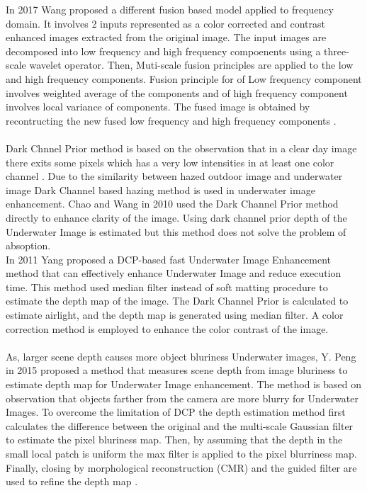\documentclass[a4paper,11pt,oneside]{article}
\begin{document}
  In 2017 Wang \cite{12} proposed a different fusion based model applied to frequency domain. It involves 2 inputs represented as a color corrected and contrast enhanced images extracted from the original image. The input images are decomposed into low frequency and high frequency compoenents using a three-scale wavelet operator. Then, Muti-scale fusion principles are applied to the low and high frequency components. Fusion principle for of Low frequency component involves weighted average of the components and of high frequency component involves local variance of components. The fused image is obtained by recontructing the new fused low frequency and high frequency components \cite{12}.\\
  \\
  Dark Chnnel Prior method is based on the observation that in a clear day image there exits some pixels which has a very low intensities in at least one color channel \cite{15}. Due to the similarity between hazed outdoor image and underwater image Dark Channel based hazing method is used in underwater image enhancement. Chao and Wang in 2010 \cite{25} used the Dark Channel Prior method directly to enhance clarity of the image. Using dark channel prior depth of the Underwater Image is estimated but this method does not solve the problem of absoption\cite{25}.\\
  In 2011 Yang \cite{8} proposed a DCP-based fast Underwater Image Enhancement method that can effectively enhance Underwater Image and reduce execution time. This method used median filter instead of soft matting procedure to estimate the depth map of the image. The Dark Channel Prior is calculated to estimate airlight, and the depth map is generated using median filter. A color correction method is employed to enhance the color contrast of the image.\\
  \\
  As, larger scene depth causes more object bluriness Underwater images, Y. Peng in 2015 \cite{3} proposed a method that measures scene depth from image bluriness to estimate depth map for Underwater Image enhancement. The method is based on observation that objects farther from the camera are more blurry for Underwater Images. To overcome the limitation of DCP the depth estimation method first calculates the difference between the original and the multi-scale Gaussian filter to estimate the pixel bluriness map. Then, by assuming that the depth in the small local patch is uniform the max filter is applied to the pixel blurriness map. Finally, closing by morphological reconstruction (CMR) and the guided filter are used to refine the depth map \cite{3}.\\
\end{document}
